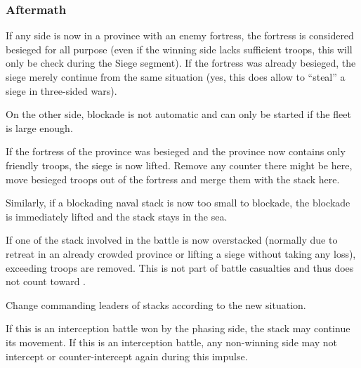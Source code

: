 \subsubsection{Aftermath}
\label{chMilitary:Battle:Cleanup:Aftermath}
If any side is now in a province with an enemy fortress, the fortress is
considered besieged for all purpose (even if the winning side lacks sufficient
troops, this will only be check during the Siege segment). If the fortress was
already besieged, the siege merely continue from the same situation (yes, this
does allow to ``steal'' a siege in three-sided wars).

On the other side, blockade is not automatic and can only be started if the
fleet is large enough.

If the fortress of the province was besieged and the province now contains
only friendly troops, the siege is now lifted. Remove any \USURE counter there
might be here, move besieged troops out of the fortress and merge them with
the stack here.

Similarly, if a blockading naval stack is now too small to blockade, the
blockade is immediately lifted and the stack stays in the sea.

If one of the stack involved in the battle is now overstacked (normally due to
retreat in an already crowded province or lifting a siege without taking any
loss), exceeding troops are removed. This is not part of battle casualties and
thus does not count toward .

Change commanding leaders of stacks according to the new situation.

If this is an interception battle won by the phasing side, the stack may
continue its movement. If this is an interception battle, any non-winning side
may not intercept or counter-intercept again during this impulse.

